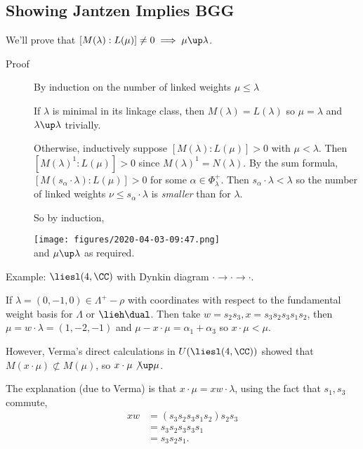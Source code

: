 \hypertarget{showing-jantzen-implies-bgg}{%
\subsection{Showing Jantzen Implies
BGG}\label{showing-jantzen-implies-bgg}}

We'll prove that
\([M(\lambda) : L(\mu)] \neq 0 \implies \mu \up \lambda\).

\begin{description}
\item[Proof]
By induction on the number of linked weights \(\mu \leq \lambda\)

If \(\lambda\) is minimal in its linkage class, then
\(M(\lambda) = L(\lambda)\) so \(\mu = \lambda\) and
\(\lambda \up \lambda\) trivially.

Otherwise, inductively suppose \([M(\lambda): L(\mu)] > 0\) with
\(\mu < \lambda\). Then \([M(\lambda)^1: L(\mu)] > 0\) since
\(M(\lambda)^1 = N(\lambda)\). By the sum formula,
\([M(s_\alpha \cdot \lambda) : L(\mu)] > 0\) for some
\(\alpha \in \Phi_\lambda^+\). Then \(s_\alpha \cdot \lambda < \lambda\)
so the number of linked weights \(\nu \leq s_\alpha \cdot \lambda\) is
\emph{smaller} than for \(\lambda\).

So by induction,

\texttt{[image: figures/2020-04-03-09:47.png]}\\

and \(\mu \up \lambda\) as required.
\end{description}

Example: \(\liesl(4, \CC)\) with Dynkin diagram
\(\cdot \to \cdot \to \cdot\).

If \(\lambda = (0, -1, 0) \in \Lambda^+ - \rho\) with coordinates with
respect to the fundamental weight basis for \(\Lambda\) or
\(\lieh\dual\). Then take \(w = s_2 s_3, x= s_3 s_2 s_3 s_1 s_2\), then
\(\mu = w\cdot \lambda = (1, -2, -1)\) and
\(\mu - x\cdot \mu = \alpha_1 + \alpha_3\) so \(x\cdot \mu < \mu\).

However, Verma's direct calculations in \(U(\liesl(4, \CC))\) showed
that \(M(x\cdot \mu) \not\subset M(\mu)\), so
\(x\cdot \mu \not\up \mu\).

The explanation (due to Verma) is that \(x\cdot \mu = xw\cdot \lambda\),
using the fact that \(s_1, s_3\) commute, \begin{align*}
xw &= (s_3 s_2 s_3 s_1 s_2) s_2 s_3 \\
&= s_3 s_2 s_3 s_3 s_1 \\
&= s_3 s_2 s_1
.\end{align*}


